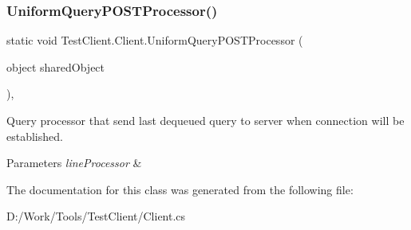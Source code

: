 \subsubsection{\texorpdfstring{Uniform\+Query\+P\+O\+S\+T\+Processor()}{UniformQueryPOSTProcessor()}}
{\footnotesize\ttfamily static void Test\+Client.\+Client.\+Uniform\+Query\+P\+O\+S\+T\+Processor (\begin{DoxyParamCaption}\item[{object}]{shared\+Object }\end{DoxyParamCaption})\hspace{0.3cm}{\ttfamily [static]}, {\ttfamily [private]}}



Query processor that send last dequeued query to server when connection will be established. 


\begin{DoxyParams}{Parameters}
{\em line\+Processor} & \\
\hline
\end{DoxyParams}


The documentation for this class was generated from the following file\+:\begin{DoxyCompactItemize}
\item 
D\+:/\+Work/\+Tools/\+Test\+Client/Client.\+cs\end{DoxyCompactItemize}
